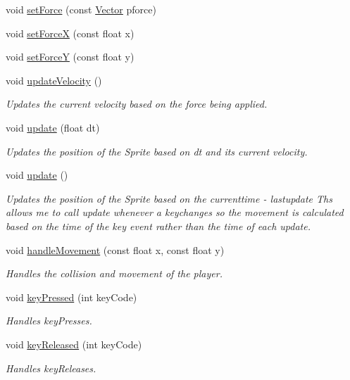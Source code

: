 \begin{DoxyCompactItemize}
void \hyperlink{class_b_player_ae97ab8470903f7c595939f2331b6c6f4}{set\-Force} (const \hyperlink{struct_vector}{\-Vector} pforce)
\item 
void \hyperlink{class_b_player_af7ae69e5c1d7880a5ebf4bd38c1adabb}{set\-Force\-X} (const float x)
\item 
void \hyperlink{class_b_player_a94916a0f75042c2e6265fa7c9ec4db32}{set\-Force\-Y} (const float y)
\item 
void \hyperlink{class_b_player_aa0f9b22686ad0aeec30ea21beb3740f2}{update\-Velocity} ()
\begin{DoxyCompactList}\small\item\em \-Updates the current velocity based on the force being applied. \end{DoxyCompactList}\item 
void \hyperlink{class_b_player_a86f9b0c0d7b4c61ed475f0e70249be7f}{update} (float dt)
\begin{DoxyCompactList}\small\item\em \-Updates the position of the \-Sprite based on dt and its current velocity. \end{DoxyCompactList}\item 
void \hyperlink{class_b_player_a709a36eb859dd8f9a4355e036eac8ac8}{update} ()
\begin{DoxyCompactList}\small\item\em \-Updates the position of the \-Sprite based on the currenttime -\/ lastupdate \-Ths allows me to call update whenever a keychanges so the movement is calculated based on the time of the key event rather than the time of each update. \end{DoxyCompactList}\item 
void \hyperlink{class_b_player_aa05278b0c6e02aeb2a2cbd514fafd446}{handle\-Movement} (const float x, const float y)
\begin{DoxyCompactList}\small\item\em \-Handles the collision and movement of the player. \end{DoxyCompactList}\item 
void \hyperlink{class_b_player_ae0aaaa33013fd5c0070cf51619abf12b}{key\-Pressed} (int key\-Code)
\begin{DoxyCompactList}\small\item\em \-Handles key\-Presses. \end{DoxyCompactList}\item 
void \hyperlink{class_b_player_a8210db4e8fac75ace4b71b3ded1df6bf}{key\-Released} (int key\-Code)
\begin{DoxyCompactList}\small\item\em \-Handles key\-Releases. \end{DoxyCompactList}\end{DoxyCompactItemize}


